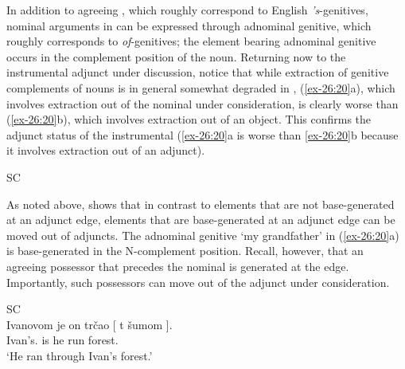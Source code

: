 \documentclass[output=paper]{langsci/langscibook}
\begin{document}
In addition to agreeing , which roughly correspond to English
\emph{'s}-genitives, nominal arguments in  can be expressed through
adnominal genitive, which roughly corresponds to  \emph{of}-genitives;
the element bearing adnominal genitive occurs in the complement position of the
noun. Returning now to the instrumental adjunct under discussion, notice that
while extraction of genitive complements of nouns is in general somewhat
degraded in , (\ref{ex-26:20}a), which involves extraction
out of the nominal under consideration, is clearly worse than
(\ref{ex-26:20}b), which involves extraction out of an object. This
confirms the adjunct status of the instrumental 
(\ref{ex-26:20}a is worse than \ref{ex-26:20}b because it involves
extraction out of an adjunct).

\ea\label{ex-26:20} \glsdesc{SC}\\
	\z
\z

As noted above, \textcite{Boskovic2018} shows that in contrast to elements
that are not base-generated at an adjunct edge, elements that are
base-generated at an adjunct edge can be moved out of adjuncts. The adnominal
genitive \enquote*{my grandfather} in (\ref{ex-26:20}a) is base-generated
in the N-complement position.  Recall, however, that an agreeing possessor that
precedes the nominal is generated at the  edge. Importantly,
such possessors can move out of the adjunct under consideration.

\ea\label{ex-26:21}\glsdesc{SC}\\
    \gll Ivanovom je on trčao [ t šumom ].\\
            Ivan’s.\Ins{} is he run {} {} forest.\Ins{}\\
	\glt    \enquote*{He ran through Ivan’s forest.}
\z
\end{document}

